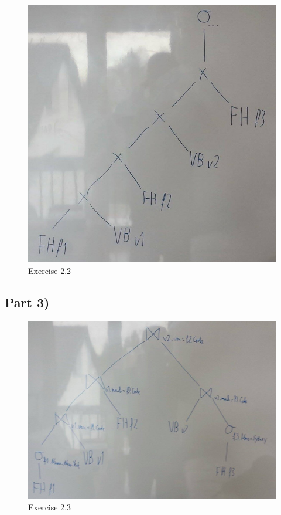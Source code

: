 \documentclass[10pt,a4paper]{article}
\begin{document}
\begin{figure}[h]
  \centering
  \includegraphics[width=\textwidth]{sheet-12/exercise-2-2}
  \caption{Exercise 2.2}
\end{figure}

\subsection*{Part 3)}

\begin{figure}[h]
  \centering
  \includegraphics[width=\textwidth]{sheet-12/exercise-2-3}
  \caption{Exercise 2.3}
\end{figure}
\end{document}
